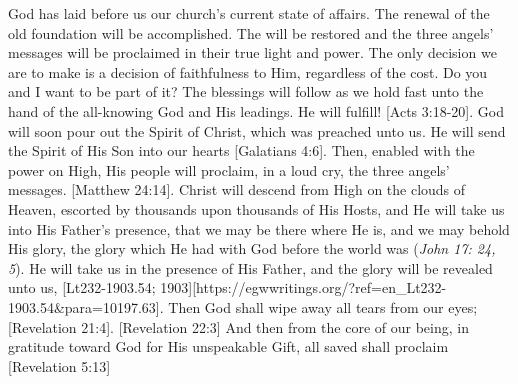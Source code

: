 God has laid before us our church’s current state of affairs. The renewal of the old foundation will be accomplished. The  will be restored and the three angels’ messages will be proclaimed in their true light and power. The only decision we are to make is a decision of faithfulness to Him, regardless of the cost. Do you and I want to be part of it? The blessings will follow as we hold fast unto the hand of the all-knowing God and His leadings.  He will fulfill! [Acts 3:18-20]. God will soon pour out the Spirit of Christ, which was preached unto us. He will send the Spirit of His Son into our hearts [Galatians 4:6].  Then, enabled with the power on High, His people will proclaim, in a loud cry, the three angels’ messages. [Matthew 24:14]. Christ will descend from High on the clouds of Heaven, escorted by thousands upon thousands of His Hosts, and He will take us into His Father’s presence, that we may be there where He is, and we may behold His glory, the glory which He had with God before the world was (\textit{John 17: 24, 5}). He will take us in the presence of His Father, and the glory will be revealed unto us, [Lt232-1903.54; 1903][https://egwwritings.org/?ref=en\_Lt232-1903.54&para=10197.63]. Then God shall wipe away all tears from our eyes; [Revelation 21:4]. [Revelation 22:3] And then from the core of our being, in gratitude toward God for His unspeakable Gift, all saved  shall proclaim [Revelation 5:13]


